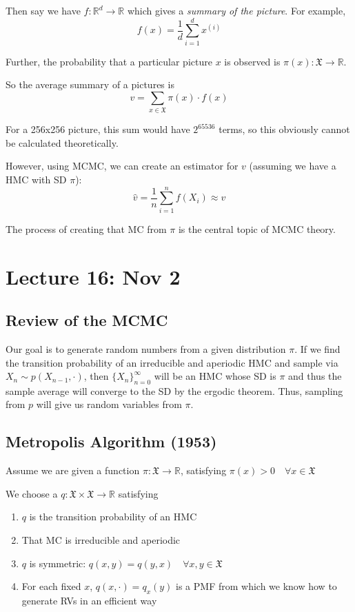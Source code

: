 \documentclass[12pt]{article}
\renewcommand{\hat}[1]{\widehat{#1}}
\newcommand{\R}{\mathbb{R}}
\newcommand{\mfX}{\mathfrak{X}}
\begin{document}
        Then say we have $f: \R^d \to \R$ which gives a \emph{summary of the picture}. For example, 
        \[f(x) = \frac{1}{d}\sum_{i=1}^d x^{(i)} \]

        Further, the probability that a particular picture $x$ is observed is $\pi(x): \mfX \to \R$. 

        So the average summary of a pictures is 
        \[v = \sum_{x \in \mfX} \pi(x) \cdot f(x)\]
        
        For a 256x256 picture, this sum would have $2^{65536}$ terms, so this obviously cannot be calculated theoretically. 

        However, using MCMC, we can create an estimator for $v$ (assuming we have a HMC with SD $\pi$):
        \[\hat v = \frac{1}{n}\sum_{i=1}^n f(X_i) \approx v\]

        The process of creating that MC from $\pi$ is the central topic of MCMC theory.

\section{Lecture 16: Nov 2 }  
    \subsection{Review of the MCMC}
        Our goal is to generate random numbers from a given distribution $\pi$. If we find the transition probability of an irreducible and aperiodic HMC and sample via $X_n \sim p(X_{n-1}, \cdot)$, then $\{X_n\}_{n=0}^\infty$ will be an HMC whose SD is $\pi$ and thus the sample average will converge to the SD by the ergodic theorem. Thus, sampling from $p$ will give us random variables from $\pi$. 

    \subsection{Metropolis Algorithm (1953)}
        Assume we are given a function $\pi: \mfX \to \R$, satisfying $\pi(x) > 0 \quad \forall x \in \mfX$

        We choose a $q: \mfX \times \mfX \to \R$ satisfying 
        \begin{enumerate}
            \item $q$ is the transition probability of an HMC
            \item That MC is irreducible and aperiodic 
            \item $q$ is symmetric: $q(x, y) = q(y, x) \quad \forall x, y \in\mfX$
            \item For each fixed $x$, $q(x, \cdot) = q_x(y)$ is a PMF from which we know how to generate RVs in an efficient way
        \end{enumerate}
\end{document}
